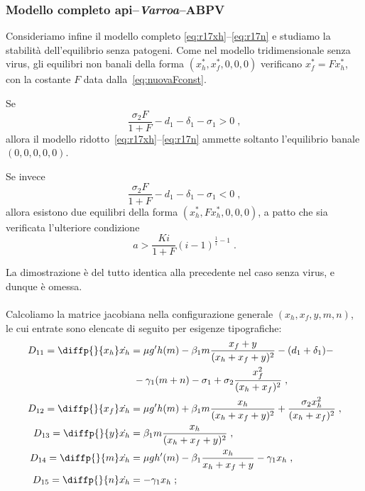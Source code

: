 \subsubsection{Modello completo api--\emph{Varroa}--ABPV}
Consideriamo infine il modello completo \eqref{eq:r17xh}--\eqref{eq:r17n} e studiamo la stabilità
dell'equilibrio senza patogeni.
Come nel modello tridimensionale senza virus, gli equilibri non banali della
forma $(x_h^*, x_f^*, 0,0,0)$ verificano $x_f^* = F x_h^*$, con
la costante $F$ data dalla~\eqref{eq:nuovaFconst}.

\begin{proposizione}
Se
$$\frac{\sigma_2 F}{1+F} - d_1 -\delta_1 -\sigma_1 > 0 \; ,$$
allora il modello ridotto~\eqref{eq:r17xh}--\eqref{eq:r17n} ammette
soltanto l'equilibrio banale $(0,0,0,0,0)$.

Se invece
$$\frac{\sigma_2 F}{1+F} - d_1 -\delta_1 -\sigma_1 < 0 \; ,$$
allora esistono due equilibri della forma $(x_h^*, F x_h^*, 0, 0, 0)$,
a patto che sia verificata l'ulteriore condizione
$$a > \frac{Ki}{1+F} {(i-1)}^{\frac{1}{i} -1} \; .$$
\label{prop:exist5D}
\end{proposizione}

La dimostrazione è del tutto identica alla precedente nel caso senza virus, e dunque è omessa.

\paragraph{}
Calcoliamo la matrice jacobiana nella configurazione generale $(x_h, x_f, y, m, n)$,
le cui entrate sono elencate di seguito per esigenze tipografiche:
\begin{equation}
\begin{split} %
D_{11} = \diffp{}{{x_h}} \dot{x_h} &=
    \mu g' h(m) - \beta_1 m \frac{x_f + y}{(x_h+x_f+y)^2} - (d_1 +\delta_1) - \\
    &~ - \gamma_1 (m+n) - \sigma_1 + \sigma_2 \frac{x_f^2}{(x_h+x_f)^2} \; , \\
D_{12} = \diffp{}{{x_f}} \dot{x_h} &= \mu g' h(m) + \beta_1 m \frac{x_h}{(x_h+x_f+y)^2} +
    \frac{\sigma_2 x_h^2}{(x_h+x_f)^2} \; , \\
D_{13} = \diffp{}{{y}} \dot{x_h} &= \beta_1 m \frac{x_h}{(x_h+x_f+y)^2} \; , \\
D_{14} = \diffp{}{m} \dot{x_h} &= \mu g h'(m) - \beta_1 \frac{x_h}{x_h+x_f+y} - \gamma_1 x_h \; , \\
D_{15} = \diffp{}{n} \dot{x_h} &= -\gamma_1 x_h \; ;
\end{split}
\end{equation}

